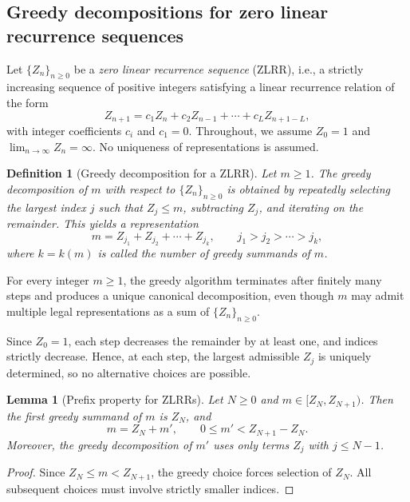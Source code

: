 \documentclass[11pt]{amsart}
\theoremstyle{plain}
\numberwithin{equation}{section} %
\newtheorem{lemma}[thm]{Lemma}
\newtheorem{definition}[thm]{Definition}
\numberwithin{table}{section} %
\numberwithin{figure}{section}
\begin{document}
	\subsection{Greedy decompositions for zero linear recurrence sequences}
	
	Let $\{Z_n\}_{n\ge0}$ be a \emph{zero linear recurrence sequence} (ZLRR), i.e.,
	a strictly increasing sequence of positive integers satisfying a linear
	recurrence relation of the form
	\[
	Z_{n+1} = c_1 Z_n + c_2 Z_{n-1} + \cdots + c_L Z_{n+1-L},
	\]
	with integer coefficients $c_i$ and $c_1=0$. Throughout, we assume
	$Z_0=1$ and $\lim_{n\to\infty} Z_n=\infty$. No uniqueness of representations
	is assumed.
	
	\begin{definition}[Greedy decomposition for a ZLRR]
		\label{def:GreedyZLRR}
		Let $m\ge1$. The \emph{greedy decomposition of $m$ with respect to $\{Z_n\}_{n\ge0}$}
		is obtained by repeatedly selecting the largest index $j$ such that
		$Z_j\le m$, subtracting $Z_j$, and iterating on the remainder. This yields a
		representation
		\[
		m = Z_{j_1}+Z_{j_2}+\cdots+Z_{j_k},
		\qquad
		j_1>j_2>\cdots>j_k,
		\]
		where $k=k(m)$ is called the number of greedy summands of $m$.
	\end{definition}
	
	
	For every integer $m\ge1$, the greedy algorithm terminates after finitely many
	steps and produces a unique canonical decomposition, even though $m$ may
	admit multiple legal representations as a sum of $\{Z_n\}_{n\ge0}$.
	
	Since $Z_0=1$, each step decreases the remainder by at least one, and indices
	strictly decrease. Hence,  at each step, the largest admissible $Z_j$ is uniquely
	determined, so no alternative choices are possible.
	
	
	\begin{lemma}[Prefix property for ZLRRs]
		\label{lem:PrefixZLRR}
		Let $N\ge0$ and $m\in[Z_N,Z_{N+1})$. Then the first greedy summand of $m$ is
		$Z_N$, and
		\[
		m = Z_N + m',
		\qquad
		0 \le m' < Z_{N+1}-Z_N.
		\]
		Moreover, the greedy decomposition of $m'$ uses only terms $Z_j$ with
		$j\le N-1$.
	\end{lemma}
	
	\begin{proof}
		Since $Z_N\le m<Z_{N+1}$, the greedy choice forces selection of $Z_N$. All
		subsequent choices must involve strictly smaller indices.
	\end{proof}
	
\end{document}
